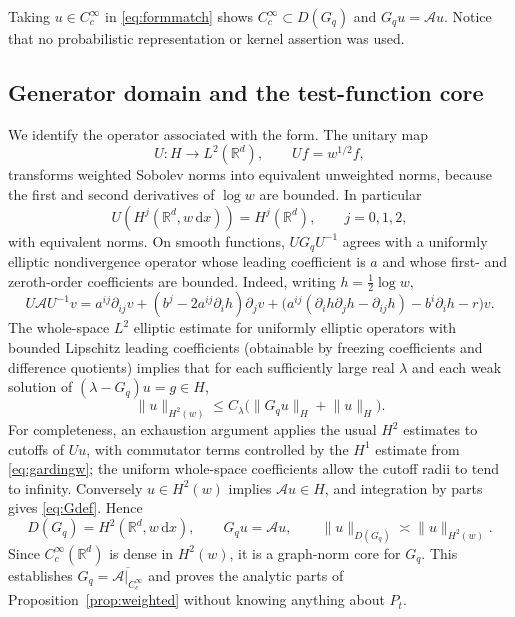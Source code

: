 \documentclass[11pt,a4paper]{article}
\theoremstyle{definition}\newtheorem{definition}{Definition}[section]\newtheorem{example}[theorem]{Example}
\theoremstyle{remark}\newtheorem{remark}[theorem]{Remark}\newtheorem{remarkSix}{Remark}[section]
\newcommand{\Rd}{\mathbb R^d}
\newcommand{\Cc}{C_c^\infty}
\newcommand{\dd}{\,\mathrm d}
\newcommand{\norm}[1]{\lVert #1\rVert}
\newcommand{\cA}{\mathcal A}
\begin{document}
Taking $u\in C_c^\infty$ in \eqref{eq:formmatch} shows $\Cc\subset D(G_q)$ and $G_qu=\cA u$. Notice that no probabilistic representation or kernel assertion was used.

\subsection{Generator domain and the test-function core}
\label{app:domain}
We identify the operator associated with the form. The unitary map
\begin{equation}\label{eq:unitary}
 U:H\to L^2(\Rd),\qquad Uf=w^{1/2}f,
\end{equation}
transforms weighted Sobolev norms into equivalent unweighted norms, because the first and second derivatives of $\log w$ are bounded. In particular
\begin{equation}\label{eq:unweight}
 U(H^j(\Rd,w\dd x))=H^j(\Rd),\qquad j=0,1,2,
\end{equation}
with equivalent norms. On smooth functions, $UG_qU^{-1}$ agrees with a uniformly elliptic nondivergence operator whose leading coefficient is $a$ and whose first- and zeroth-order coefficients are bounded. Indeed, writing $h=\tfrac12\log w$,
\begin{equation}\label{eq:conjugate}
 U\cA U^{-1}v=
 a^{ij}\partial_{ij}v+(b^j-2a^{ij}\partial_i h)\partial_jv
 +\bigl(a^{ij}(\partial_i h\partial_jh-\partial_{ij}h)-b^i\partial_i h-r\bigr)v.
\end{equation}
The whole-space $L^2$ elliptic estimate for uniformly elliptic operators with bounded Lipschitz leading coefficients (obtainable by freezing coefficients and difference quotients) implies that for each sufficiently large real $\lambda$ and each weak solution of $(\lambda-G_q)u=g\in H$,
\begin{equation}\label{eq:globalH2w}
 \norm u_{H^2(w)}\le C_\lambda\bigl(\norm{G_qu}_H+\norm u_H\bigr).
\end{equation}
For completeness, an exhaustion argument applies the usual $H^2$ estimates to cutoffs of $Uu$, with commutator terms controlled by the $H^1$ estimate from \eqref{eq:gardingw}; the uniform whole-space coefficients allow the cutoff radii to tend to infinity. Conversely $u\in H^2(w)$ implies $\cA u\in H$, and integration by parts gives \eqref{eq:Gdef}. Hence
\begin{equation}\label{eq:domainresult}
 D(G_q)=H^2(\Rd,w\dd x),\qquad G_qu=\cA u,
 \qquad\norm u_{D(G_q)}\asymp\norm u_{H^2(w)}.
\end{equation}
Since $C_c^\infty(\Rd)$ is dense in $H^2(w)$, it is a graph-norm core for $G_q$. This establishes $G_q=\overline{\cA|_{\Cc}}$ and proves the analytic parts of Proposition~\ref{prop:weighted} without knowing anything about $P_t$.
\end{document}
